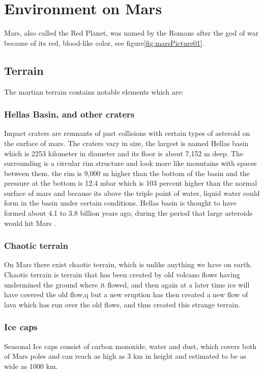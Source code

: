 \chapter{Environment on Mars}\label{ch:environmentOnMars}

Mars, also called the Red Planet, was named by the Romans after the god of war because of its red, blood-like color, see figure\ref{fig:marsPicture01}. 

\section{Terrain} 
The martian terrain contains notable elements which are:

\subsection{Hellas Basin, and other craters}
Impact craters are remnants of past collisions with certain types of asteroid on the surface of mars. The craters vary in size, the largest is named Hellas basin which is 2253 kilometer in diameter and its floor is about 7,152 m  deep. The surrounding is a circular rim structure and look more like mountains with spaces between them.
the rim is 9,000 m higher than the bottom of the basin and the pressure at the bottom is 12.4  mbar which is  103 percent higher than the normal surface of mars  and because its above the triple point of water, liquid water could form in the basin under certain conditions. Hellas basin is thought to have formed about 4.1 to 3.8 billion years ago, during the period that large asteroids would hit Mars \cite{hellas}.

\subsection{Chaotic terrain}
On Mars there exist chaotic terrain, which is unlike anything we have on earth.\\
Chaotic terrain is terrain that has been created by old volcano flows having undermined the ground where it flowed, and then again at a later time ice will have covered the old flow,q but a new eruption has then created a new flow of lava which has run over the old flows, and thus created this strange terrain\cite{CTerrain}.

\subsection{Ice caps}
Seasonal Ice caps consist of carbon monoxide, water and dust, which covers both of Mars poles and can reach as high as 3 km in height and estimated to be as wide as 1000 km.

